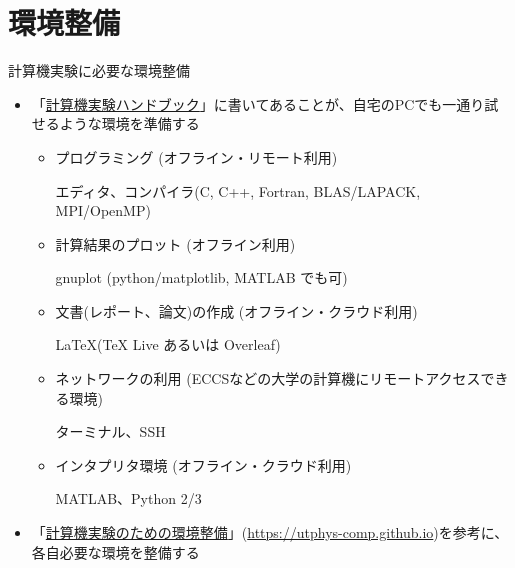 \section{環境整備}

\begin{frame}[t,fragile]{計算機実験に必要な環境整備}
  \begin{itemize}
  \item 「\href{https://github.com/utphys-comp/handbook/releases/download/handbook-2019/handbook.pdf}{計算機実験ハンドブック}」に書いてあることが、自宅のPCでも一通り試せるような環境を準備する
    \begin{itemize}
    \item プログラミング (オフライン・リモート利用)

      エディタ、コンパイラ(C, C++, Fortran, BLAS/LAPACK, MPI/OpenMP)
    \item 計算結果のプロット (オフライン利用)

      gnuplot (python/matplotlib, MATLAB でも可)
    \item 文書(レポート、論文)の作成 (オフライン・クラウド利用)

      \LaTeX (TeX Live あるいは Overleaf)
    \item ネットワークの利用 (ECCSなどの大学の計算機にリモートアクセスできる環境)

      ターミナル、SSH
    \item インタプリタ環境 (オフライン・クラウド利用)

      MATLAB、Python 2/3
    \end{itemize}
  \item 「\href{https://utphys-comp.github.io}{計算機実験のための環境整備}」({\small \href{https://utphys-comp.github.io}{https://utphys-comp.github.io}})を参考に、各自必要な環境を整備する
  \end{itemize}
\end{frame}

